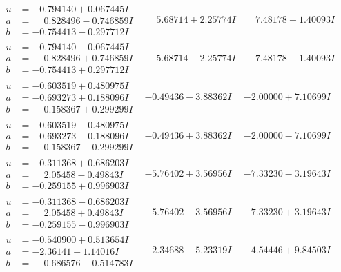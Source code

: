 \documentclass[1p]{elsarticle_modified}
\theoremstyle{definition}
\begin{document}
$$\begin{array}{c|c|c}
\begin{aligned}
u &= -0.794140 + 0.067445 I \\
a &= \phantom{-}0.828496 - 0.746859 I \\
b &= -0.754413 - 0.297712 I\end{aligned}
 & \phantom{-}5.68714 + 2.25774 I & \phantom{-}7.48178 - 1.40093 I \\ \hline\begin{aligned}
u &= -0.794140 - 0.067445 I \\
a &= \phantom{-}0.828496 + 0.746859 I \\
b &= -0.754413 + 0.297712 I\end{aligned}
 & \phantom{-}5.68714 - 2.25774 I & \phantom{-}7.48178 + 1.40093 I \\ \hline\begin{aligned}
u &= -0.603519 + 0.480975 I \\
a &= -0.693273 + 0.188096 I \\
b &= \phantom{-}0.158367 + 0.299299 I\end{aligned}
 & -0.49436 - 3.88362 I & -2.00000 + 7.10699 I \\ \hline\begin{aligned}
u &= -0.603519 - 0.480975 I \\
a &= -0.693273 - 0.188096 I \\
b &= \phantom{-}0.158367 - 0.299299 I\end{aligned}
 & -0.49436 + 3.88362 I & -2.00000 - 7.10699 I \\ \hline\begin{aligned}
u &= -0.311368 + 0.686203 I \\
a &= \phantom{-}2.05458 - 0.49843 I \\
b &= -0.259155 + 0.996903 I\end{aligned}
 & -5.76402 + 3.56956 I & -7.33230 - 3.19643 I \\ \hline\begin{aligned}
u &= -0.311368 - 0.686203 I \\
a &= \phantom{-}2.05458 + 0.49843 I \\
b &= -0.259155 - 0.996903 I\end{aligned}
 & -5.76402 - 3.56956 I & -7.33230 + 3.19643 I \\ \hline\begin{aligned}
u &= -0.540900 + 0.513654 I \\
a &= -2.36141 + 1.14016 I \\
b &= \phantom{-}0.686576 - 0.514783 I\end{aligned}
 & -2.34688 - 5.23319 I & -4.54446 + 9.84503 I \\ \hline\begin{aligned}

\end{aligned}
\end{array}$$
\end{document}
